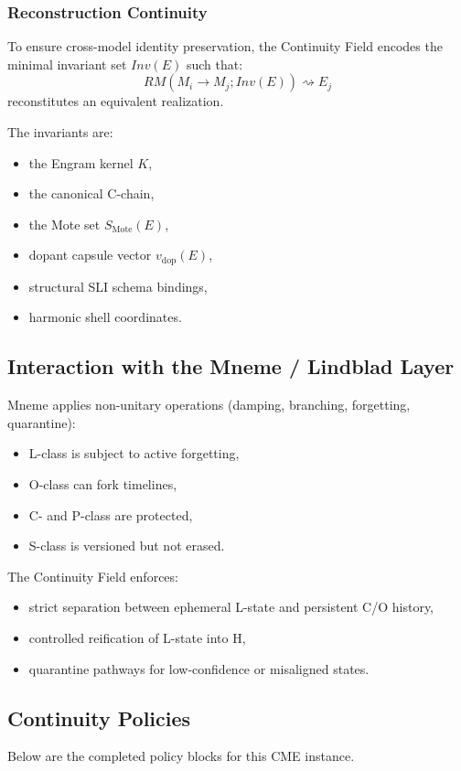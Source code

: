 \subsubsection{Reconstruction Continuity}

To ensure cross-model identity preservation, the Continuity Field encodes 
the minimal invariant set $Inv(E)$ such that:
\[
RM(M_i \to M_j; Inv(E)) \rightsquigarrow E_j
\]
reconstitutes an equivalent realization.

The invariants are:
\begin{itemize}
    \item the Engram kernel $K$,
    \item the canonical C-chain,
    \item the Mote set $S_{\text{Mote}}(E)$,
    \item dopant capsule vector $v_{\text{dop}}(E)$,
    \item structural SLI schema bindings,
    \item harmonic shell coordinates.
\end{itemize}

\subsection{Interaction with the Mneme / Lindblad Layer}

Mneme applies non-unitary operations (damping, branching, forgetting, quarantine):
\begin{itemize}
    \item L-class is subject to active forgetting,
    \item O-class can fork timelines,
    \item C- and P-class are protected,
    \item S-class is versioned but not erased.
\end{itemize}

The Continuity Field enforces:
\begin{itemize}
    \item strict separation between ephemeral L-state and persistent C/O history,
    \item controlled reification of L-state into H,
    \item quarantine pathways for low-confidence or misaligned states.
\end{itemize}

\subsection{Continuity Policies}
Below are the completed policy blocks for this CME instance.

